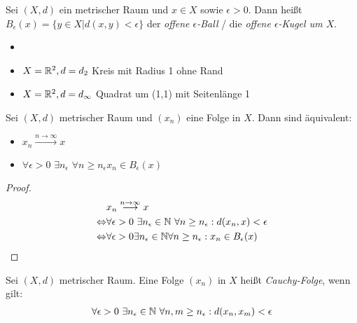 \begin{Definition}{%
	Sei $(X,d)$ ein metrischer Raum und $x \in X$ sowie $\epsilon > 0$. Dann heißt 
	$B_\epsilon (x) = \{ y \in X \vert d(x,y) < \epsilon\}$ der \emph{offene 
	$\epsilon$-Ball} / die \emph{offene $\epsilon$-Kugel um $X$}.
}\end{Definition}

\begin{Beispiel}{
	\begin{itemize}
		\item[ ]
		\item $X = \mathbb{R}^2, d = d_2$ Kreis mit Radius 1 ohne Rand
		\item $X = \mathbb{R}^2, d = d_\infty$ Quadrat um (1,1) mit Seitenlänge 1
	\end{itemize}
}\end{Beispiel}

\begin{Lemma}{%
	Sei $(X,d)$ metrischer Raum und $(x_n)$ eine Folge in $X$. Dann sind äquivalent:
	\begin{itemize}
		\item $x_n \overset{n\rightarrow \infty}{\longrightarrow}x$
		\item $\forall \epsilon > 0$ $\exists n_\epsilon$ $\forall n \geq n_\epsilon  
			x_n \in B_\epsilon (x)$
	\end{itemize}
}\end{Lemma}

\begin{proof}
	\begin{align*}
		& x_n \overset{n\rightarrow \infty}{\longrightarrow} x \\
		\Leftrightarrow & \forall \epsilon > 0 
			\text{ }\exists n_\epsilon \in \mathbb{N} \text{ }\forall n \geq n_\epsilon: 
			d(x_n,x) < \epsilon \\
		\Leftrightarrow & \forall \epsilon > 0 \exists n_\epsilon \in \mathbb{N} \forall n \geq 
	n_\epsilon: x_n \in B_\epsilon(x)
	\end{align*} 
\end{proof}

\begin{Definition}[Einschub]{
	Sei $(X,d)$ metrischer Raum. Eine Folge $(x_n)$ in $X$ heißt \emph{Cauchy-Folge}, wenn gilt: 
	\begin{align*}
	\forall \epsilon > 0 \text{ } \exists n_\epsilon \in \mathbb{N} \text{ } \forall n, m 
		\geq n_\epsilon: d(x_n,x_m) < \epsilon
	\end{align*}
}\end{Definition}